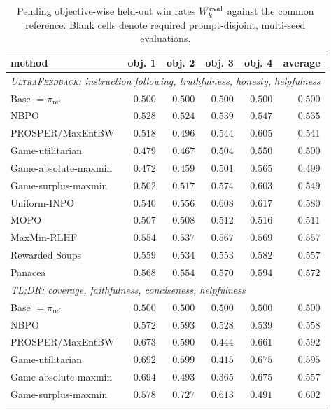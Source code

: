 \documentclass{article}
\theoremstyle{remark}
\theoremstyle{plain}
\newcommand{\piref}{\pi_{\mathrm{ref}}}
\newcommand{\NBPO}{\textsc{NBPO}}
\begin{document}
\begin{table}[t]
\centering\scriptsize
\setlength{\tabcolsep}{2.5pt}
\caption{Pending objective-wise held-out win rates $W_k^{\rm eval}$ against the common reference. Blank cells denote required prompt-disjoint, multi-seed evaluations.}
\label{tab:neutral-objectivewise}
\begin{tabular}{lrrrrr}
\toprule
method & obj. 1 & obj. 2 & obj. 3 & obj. 4 & average\\
\midrule
\multicolumn{6}{l}{\textit{\textsc{UltraFeedback}: instruction following, truthfulness, honesty, helpfulness}}\\
Base $=\piref$ & $0.500$ & $0.500$ & $0.500$ & $0.500$ & $0.500$\\
\NBPO{} & $0.528$ & $0.524$ & $0.539$ & $0.547$ & $0.535$\\
PROSPER/MaxEntBW & $0.518$ & $0.496$ & $0.544$ & $0.605$ & $0.541$\\
Game-utilitarian & $0.479$ & $0.467$ & $0.504$ & $0.550$ & $0.500$\\
Game-absolute-maxmin & $0.472$ & $0.459$ & $0.501$ & $0.565$ & $0.499$\\
Game-surplus-maxmin & $0.502$ & $0.517$ & $0.574$ & $0.603$ & $0.549$\\
Uniform-INPO & $0.540$ & $0.556$ & $0.608$ & $0.617$ & $0.580$\\
MOPO & $0.507$ & $0.508$ & $0.512$ & $0.516$ & $0.511$\\
MaxMin-RLHF & $0.554$ & $0.537$ & $0.567$ & $0.569$ & $0.557$\\
Rewarded Soups & $0.559$ & $0.534$ & $0.553$ & $0.582$ & $0.557$\\
Panacea & $0.568$ & $0.554$ & $0.570$ & $0.594$ & $0.572$\\
\midrule
\multicolumn{6}{l}{\textit{\textsc{TL;DR}: coverage, faithfulness, conciseness, helpfulness}}\\
Base $=\piref$ & $0.500$ & $0.500$ & $0.500$ & $0.500$ & $0.500$\\
\NBPO{} & $0.572$ & $0.593$ & $0.528$ & $0.539$ & $0.558$\\
PROSPER/MaxEntBW & $0.673$ & $0.590$ & $0.444$ & $0.661$ & $0.592$\\
Game-utilitarian & $0.692$ & $0.599$ & $0.415$ & $0.675$ & $0.595$\\
Game-absolute-maxmin & $0.694$ & $0.493$ & $0.365$ & $0.675$ & $0.557$\\
Game-surplus-maxmin & $0.578$ & $0.727$ & $0.613$ & $0.491$ & $0.602$\\

\end{tabular}
\end{table}
\end{document}
